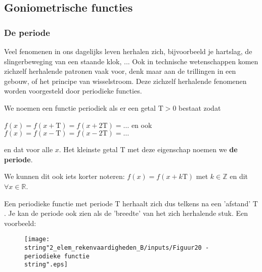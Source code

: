 


\subsection{Goniometrische functies}

\subsubsection{De periode}

\noindent Veel fenomenen in ons dagelijks leven herhalen zich, bijvoorbeeld
je hartslag, de slingerbeweging van een staande klok, ... Ook in technische
wetenschappen komen zichzelf herhalende patronen vaak voor, denk maar
aan de trillingen in een gebouw, of het principe van wisselstroom.
Deze zichzelf herhalende fenomenen worden voorgesteld door periodieke
functies.\medskip{}


\noindent We noemen een functie periodiek als er een getal $\textrm{T}>0$
bestaat zodat

$f(x)=f(x+\textrm{T})=f(x+2\textrm{T})=\ldots$ en ook $f(x)=f(x-\textrm{T})=f(x-2\textrm{T})=\ldots$

\noindent en dat voor alle $x$. Het kleinste getal T met deze eigenschap
noemen we \textbf{de periode}.

\noindent \medskip{}


\noindent We kunnen dit ook iets korter noteren: $f(x)=f(x+k\textrm{T})$
met $k\in\mathbb{Z}$ en dit $\forall x\in\mathbb{R}$.

\noindent \medskip{}
Een periodieke functie met periode $\textrm{T}$ herhaalt zich dus
telkens na een \textquoteright afstand\textquoteright{} $\textrm{T}$.
Je kan de periode ook zien als de \textquoteright breedte\textquoteright{}
van het zich herhalende stuk. Een voorbeeld:

\noindent 
\begin{figure}[h]
\centering{}\texttt{[image: \\string"2\_elem\_rekenvaardigheden\_B/inputs/Figuur20 - periodieke functie\\string".eps]} 
\end{figure}


